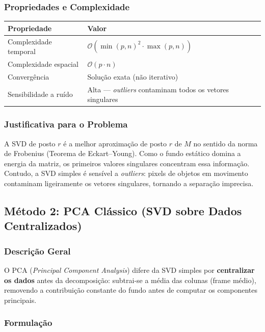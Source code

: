 \documentclass[12pt, a4paper]{article}
\begin{document}
\subsubsection{Propriedades e Complexidade}

\begin{tabular}{ll}
  \toprule
  Propriedade           & Valor \\
  \midrule
  Complexidade temporal & $\mathcal{O}(\min(p,n)^2 \cdot \max(p,n))$ \\
  Complexidade espacial & $\mathcal{O}(p \cdot n)$ \\
  Convergência          & Solução exata (não iterativo) \\
  Sensibilidade a ruído & Alta — \emph{outliers} contaminam todos os vetores singulares \\
  \bottomrule
\end{tabular}

\subsubsection{Justificativa para o Problema}

A SVD de posto $r$ é a melhor aproximação de posto $r$ de $M$ no sentido da
norma de Frobenius (Teorema de Eckart–Young). Como o fundo estático domina a
energia da matriz, os primeiros valores singulares concentram essa informação.
Contudo, a SVD simples é sensível a \emph{outliers}: pixels de objetos em
movimento contaminam ligeiramente os vetores singulares, tornando a separação
imprecisa.


\subsection{Método 2: PCA Clássico (SVD sobre Dados Centralizados)}

\subsubsection{Descrição Geral}

O PCA (\emph{Principal Component Analysis}) difere da SVD simples por
\textbf{centralizar os dados} antes da decomposição: subtrai-se a média das
colunas (frame médio), removendo a contribuição constante do fundo antes de
computar os componentes principais.

\subsubsection{Formulação}
\end{document}
